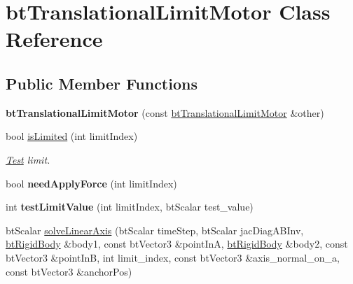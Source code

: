 \hypertarget{classbt_translational_limit_motor}{\section{bt\+Translational\+Limit\+Motor Class Reference}
\label{classbt_translational_limit_motor}
}
\subsection*{Public Member Functions}
\begin{DoxyCompactItemize}
\item 
\hypertarget{classbt_translational_limit_motor_ad06b8b53ab20a22ec33b091e42eea822}{{\bfseries bt\+Translational\+Limit\+Motor} (const \hyperlink{classbt_translational_limit_motor}{bt\+Translational\+Limit\+Motor} \&other)}\label{classbt_translational_limit_motor_ad06b8b53ab20a22ec33b091e42eea822}

\item 
bool \hyperlink{classbt_translational_limit_motor_ae5bb30b955dcd0923d72642e37f00622}{is\+Limited} (int limit\+Index)
\begin{DoxyCompactList}\small\item\em \hyperlink{class_test}{Test} limit. \end{DoxyCompactList}\item 
\hypertarget{classbt_translational_limit_motor_a635a5c4078ef1b5a8fa171071843b62f}{bool {\bfseries need\+Apply\+Force} (int limit\+Index)}\label{classbt_translational_limit_motor_a635a5c4078ef1b5a8fa171071843b62f}

\item 
\hypertarget{classbt_translational_limit_motor_a74698c3a1b13a97371fd1eff60201f3a}{int {\bfseries test\+Limit\+Value} (int limit\+Index, bt\+Scalar test\+\_\+value)}\label{classbt_translational_limit_motor_a74698c3a1b13a97371fd1eff60201f3a}

\item 
bt\+Scalar \hyperlink{classbt_translational_limit_motor_a40857b3a98cd8d8fc986516985726e49}{solve\+Linear\+Axis} (bt\+Scalar time\+Step, bt\+Scalar jac\+Diag\+A\+B\+Inv, \hyperlink{classbt_rigid_body}{bt\+Rigid\+Body} \&body1, const bt\+Vector3 \&point\+In\+A, \hyperlink{classbt_rigid_body}{bt\+Rigid\+Body} \&body2, const bt\+Vector3 \&point\+In\+B, int limit\+\_\+index, const bt\+Vector3 \&axis\+\_\+normal\+\_\+on\+\_\+a, const bt\+Vector3 \&anchor\+Pos)
\end{DoxyCompactItemize}

